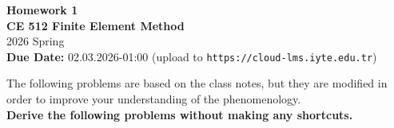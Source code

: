 \documentclass[11pt, a4paper]{article}
\begin{document}
\begin{center}
    {\Large \textbf{Homework 1}} \\[0.2cm]
    {\large \textbf{CE 512 Finite Element Method}} \\[0.1cm]
    {\large 2026 Spring} \\[0.3cm]
    \textbf{Due Date:} 02.03.2026-01:00 (upload to \texttt{https://cloud-lms.iyte.edu.tr})
\end{center}

\vspace{0.5cm}

\noindent The following problems are based on the class notes, but they are modified in order to improve your understanding of the phenomenology. \\

\noindent \textbf{Derive the following problems without making any shortcuts.}

\vspace{0.5cm}
\end{document}
